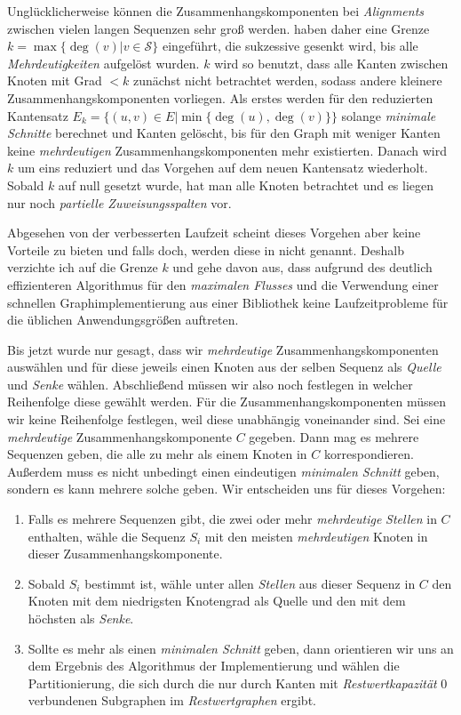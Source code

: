 Unglücklicherweise können die Zusammenhangskomponenten bei \emph{Alignments} zwischen vielen langen Sequenzen sehr groß werden. \cite{cpm10} haben daher eine Grenze $k = \max\{\deg(v)| v \in \mathcal{S}\}$ eingeführt, die sukzessive gesenkt wird, bis alle \emph{Mehrdeutigkeiten} aufgelöst wurden. $k$ wird so benutzt, dass alle Kanten zwischen Knoten mit Grad $< k$ zunächst nicht betrachtet werden, sodass andere kleinere Zusammenhangskomponenten vorliegen. Als erstes werden für den reduzierten Kantensatz $E_k = \{(u,v) \in E|\min\{\deg(u),\deg(v)\}\}$ solange \emph{minimale Schnitte} berechnet und Kanten gelöscht, bis für den Graph mit weniger Kanten keine \emph{mehrdeutigen} Zusammenhangskomponenten mehr existierten. Danach wird $k$ um eins reduziert und das Vorgehen auf dem neuen Kantensatz wiederholt. Sobald $k$ auf null gesetzt wurde, hat man alle Knoten betrachtet und es liegen nur noch \emph{partielle Zuweisungsspalten} vor. 

Abgesehen von der verbesserten Laufzeit scheint dieses Vorgehen aber keine Vorteile zu bieten und falls doch, werden diese in \cite{cpm10} nicht genannt. Deshalb verzichte ich auf die Grenze $k$ und gehe davon aus, dass aufgrund des deutlich effizienteren Algorithmus für den \emph{maximalen Flusses} und die Verwendung einer schnellen Graphimplementierung aus einer Bibliothek keine Laufzeitprobleme für die üblichen Anwendungsgrößen auftreten.

Bis jetzt wurde nur gesagt, dass wir \emph{mehrdeutige} Zusammenhangskomponenten auswählen und für diese jeweils einen Knoten aus der selben Sequenz als \emph{Quelle} und \emph{Senke} wählen. Abschließend müssen wir also noch festlegen in welcher Reihenfolge diese gewählt werden. Für die Zusammenhangskomponenten müssen wir keine Reihenfolge festlegen, weil diese unabhängig voneinander sind. Sei eine \emph{mehrdeutige} Zusammenhangskomponente $C$ gegeben. Dann mag es mehrere Sequenzen geben, die alle zu mehr als einem Knoten in $C$ korrespondieren. Außerdem muss es nicht unbedingt einen eindeutigen \emph{minimalen Schnitt} geben, sondern es kann mehrere solche geben. Wir entscheiden uns für dieses Vorgehen:

\begin{enumerate}[topsep=0pt,itemsep=-1ex,partopsep=1ex,parsep=1ex]
	\item Falls es mehrere Sequenzen gibt, die zwei oder mehr \emph{mehrdeutige} \emph{Stellen} in $C$ enthalten, wähle die Sequenz $S_i$ mit den meisten \emph{mehrdeutigen} Knoten in dieser Zusammenhangskomponente.
	\item Sobald $S_i$ bestimmt ist, wähle unter allen \emph{Stellen} aus dieser Sequenz in $C$ den Knoten mit dem niedrigsten Knotengrad als Quelle und den mit dem höchsten als \emph{Senke}.
	\item Sollte es mehr als einen \emph{minimalen Schnitt} geben, dann orientieren wir uns an dem Ergebnis des Algorithmus der Implementierung und wählen die Partitionierung, die sich durch die nur durch Kanten mit \emph{Restwertkapazität} 0 verbundenen Subgraphen im \emph{Restwertgraphen} ergibt. 
\end{enumerate}


